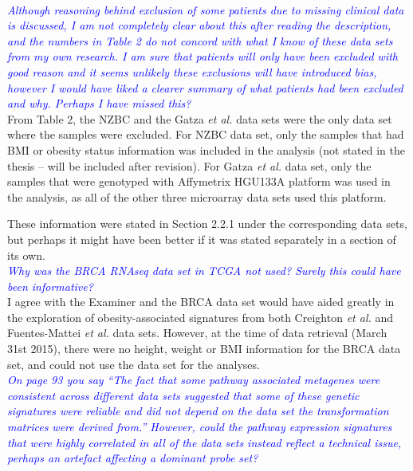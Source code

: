 \documentclass[a4paper, 12pt]{article}
\begin{document}
\noindent
\\

\noindent
\textcolor{blue}{
	\textit{Although reasoning behind exclusion of some patients due to missing clinical data is discussed, I am not completely clear about this after reading the description, and the numbers in Table 2 do not concord with what I know of these data sets from my own research.
	I am sure that patients will only have been excluded with good reason and it seems unlikely these exclusions will have introduced bias, however I would have liked a clearer summary of what patients had been excluded and why.
	Perhaps I have missed this?
	}
}\\

\noindent
From Table 2, the NZBC and the Gatza \textit{et al.} data sets were the only data set where the samples were excluded.
For NZBC data set, only the samples that had BMI or obesity status  information was included in the analysis (not stated in the thesis --  will be included after revision).
For Gatza \textit{et al.} data set, only the samples that were genotyped with Affymetrix HGU133A platform was used in the analysis, as all of the other three microarray data sets used this platform.

These information were stated in Section 2.2.1 under the corresponding data sets, but perhaps it might have been better if it was stated separately in a section of its own.
\\

\noindent
\textcolor{blue}{
	\textit{Why was the BRCA RNAseq data set in TCGA not used?
	Surely this could have been informative?
	}
}\\

\noindent
I agree with the Examiner and the BRCA data set would have aided greatly in the exploration of obesity-associated signatures from both Creighton \textit{et al.} and Fuentes-Mattei \textit{et al.} data sets.
However, at the time of data retrieval (March 31st 2015), there were no height, weight or BMI information for the BRCA data set, and could not use the data set for the analyses.
\\

\noindent
\textcolor{blue}{
	\textit{On page 93 you say ``The fact that some pathway associated metagenes were consistent across different data sets suggested that some of these genetic signatures were reliable and did not depend on the data set the transformation matrices were derived from.''
	However, could the pathway expression signatures that were highly correlated in all of the  data sets instead reflect a technical issue, perhaps an artefact affecting a dominant probe set?
	}
}\\
\end{document}
